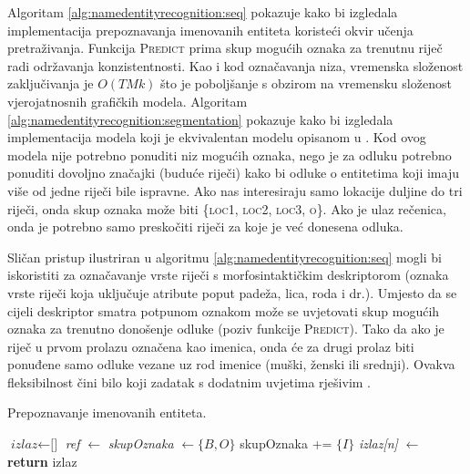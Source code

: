 Algoritam \ref{alg:namedentityrecognition:seq} pokazuje kako bi izgledala
implementacija prepoznavanja imenovanih entiteta koristeći okvir učenja
pretraživanja. Funkcija \textsc{Predict} prima skup mogućih oznaka za trenutnu
riječ radi održavanja konzistentnosti. Kao i kod označavanja niza, vremenska
složenost zaključivanja je $O(T M k)$ što je poboljšanje s obzirom na vremensku
složenost vjerojatnosnih grafičkih modela. Algoritam
\ref{alg:namedentityrecognition:segmentation} pokazuje kako bi izgledala
implementacija modela koji je ekvivalentan modelu opisanom u
\citep{sarawagi2004semi}. Kod ovog modela nije potrebno ponuditi niz mogućih
oznaka, nego je za odluku potrebno ponuditi dovoljno značajki (buduće riječi)
kako bi odluke o entitetima koji imaju više od jedne riječi bile ispravne. Ako
nas interesiraju samo lokacije duljine do tri riječi, onda skup oznaka može biti
\{\textsc{loc1}, \textsc{loc2}, \textsc{loc3}, \textsc{o}\}. Ako je ulaz
rečenica, onda je potrebno samo preskočiti riječi za koje je već donesena
odluka.

Sličan pristup ilustriran u algoritmu \ref{alg:namedentityrecognition:seq} mogli
bi iskoristiti za označavanje vrste riječi s morfosintaktičkim deskriptorom
(oznaka vrste riječi koja uključuje atribute poput padeža, lica, roda i dr.).
Umjesto da se cijeli deskriptor smatra potpunom oznakom može se uvjetovati skup
mogućih oznaka za trenutno donošenje odluke (poziv funkcije \textsc{Predict}).
Tako da ako je riječ u prvom prolazu označena kao imenica, onda će za
drugi prolaz biti ponuđene samo odluke vezane uz rod imenice (muški, ženski
ili srednji). Ovakva fleksibilnost čini bilo koji zadatak s dodatnim uvjetima
 rješivim \citep{chang2012structured}.

\begin{algorithm}[H]
\caption{Prepoznavanje imenovanih entiteta.}
\label{alg:namedentityrecognition:seq}
\begin{algorithmic}[1]
\State $\textit{izlaz} \gets \text{[]}$
  \State \textit{ref} $\gets$ 
  \State \textit{skupOznaka} $\gets \{B,O\}$
    \State skupOznaka += $\{I\}$
  \EndIf
  \State \textit{izlaz[n]} $\gets$ 
\EndFor
\State {}
\State \textbf{return} izlaz
\EndFunction
\end{algorithmic}
\end{algorithm}

